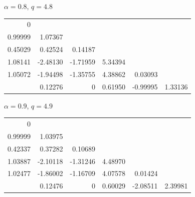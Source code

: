 \begin{table}[ht]
\medskip
\begin{minipage}[t]{0.49\textwidth}\centering $\alpha=0.8$, $q=4.8$\\[3pt]
{\footnotesize\setlength{\tabcolsep}{2.5pt}
\begin{tabular}{r|rrrrr}
0 &  &  &  &  &  \\
0.99999 & 1.07367 &  &  &  &  \\
0.45029 & 0.42524 & 0.14187 &  &  &  \\
1.08141 & -2.48130 & -1.71959 & 5.34394 &  &  \\
1.05072 & -1.94498 & -1.35755 & 4.38862 & 0.03093 &  \\
\hline
 & 0.12276 & 0 & 0.61950 & -0.99995 & 1.33136
\end{tabular}}
\end{minipage}\hfill\begin{minipage}[t]{0.49\textwidth}\centering $\alpha=0.9$, $q=4.9$\\[3pt]
{\footnotesize\setlength{\tabcolsep}{2.5pt}
\begin{tabular}{r|rrrrr}
0 &  &  &  &  &  \\
0.99999 & 1.03975 &  &  &  &  \\
0.42337 & 0.37282 & 0.10689 &  &  &  \\
1.03887 & -2.10118 & -1.31246 & 4.48970 &  &  \\
1.02477 & -1.86002 & -1.16709 & 4.07578 & 0.01424 &  \\
\hline
 & 0.12476 & 0 & 0.60029 & -2.08511 & 2.39981
\end{tabular}}
\end{minipage}
\end{table}
